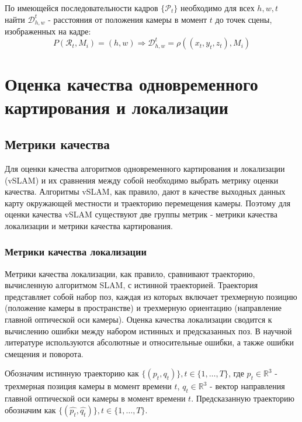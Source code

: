 \documentclass{mipt-thesis-ms}
\begin{document}
	По имеющейся последовательности кадров $\{\mathcal{P}_t\}$ необходимо для всех $h,w,t$ найти $\mathcal{D}^t_{h,w}$ - расстояния от положения камеры в момент $t$ до точек сцены, изображенных на кадре:
	$$P(\mathcal{R}_t, M_i) = (h, w) \Rightarrow \mathcal{D}^t_{h,w} = \rho((x_t, y_t, z_t), M_i)$$
	
		
	\chapter{Оценка качества одновременного картирования и локализации}
	
	\section{Метрики качества}
	
	Для оценки качества алгоритмов одновременного картирования и локализации (vSLAM) и их сравнения между собой необходимо выбрать метрику оценки качества. Алгоритмы vSLAM, как правило, дают в качестве выходных данных карту окружающей местности и траекторию перемещения камеры. Поэтому для оценки качества vSLAM существуют две группы метрик - метрики качества локализации и метрики качества картирования.
	
	\subsection{Метрики качества локализации}
	
	Метрики качества локализации, как правило, сравнивают траекторию, вычисленную алгоритмом SLAM, с истинной траекторией. Траектория представляет собой набор поз, каждая из которых включает трехмерную позицию (положение камеры в пространстве) и трехмерную ориентацию (направление главной оптической оси камеры). Оценка качества локализации сводится к вычислению ошибки между набором истинных и предсказанных поз. В научной литературе используются абсолютные и относительные ошибки, а также ошибки смещения и поворота.
	
	Обозначим истинную траекторию как $\{(p_t, q_t)\}, t \in \{1, \dots, T\}$, где $p_t \in \mathbb{R}^3$ - трехмерная позиция камеры в момент времени $t$, $q_t \in \mathbb{R}^3$ - вектор направления главной оптической оси камеры в момент времени $t$. Предсказанную траекторию обозначим как $\{(\widehat{p_t}, \widehat{q_t})\}, t \in \{1, \dots, T\}$.
	
\end{document}
